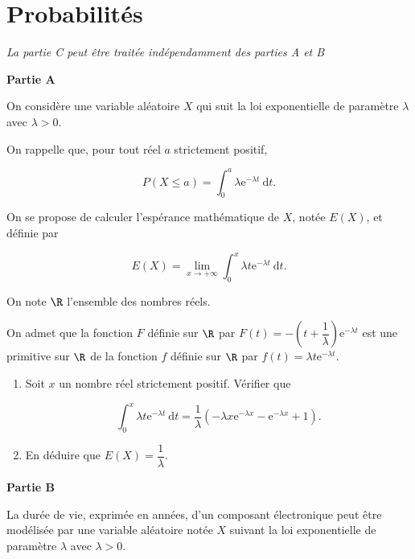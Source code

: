 \documentclass{cornouaille}
\begin{document}
\section{Probabilités}
\begin{exercice}



\emph{La partie C peut être traitée indépendamment des parties A et B}

\bigskip

\textbf{Partie A}

\medskip

On considère une variable aléatoire $X$ qui suit la loi exponentielle de paramètre $\lambda$ avec $\lambda > 0$.

On rappelle que, pour tout réel $a$ strictement positif,

\[P(X \leqslant  a) = \displaystyle\int_0^a \lambda\text{e}^{- \lambda t}\:\text{d}t.\]

On se propose de calculer l'espérance mathématique de $X$, notée $E(X)$, et définie par

\[E(X) = \displaystyle\lim_{x \to + \infty} \int_0^x \lambda t \text{e}^{- \lambda t}\:\text{d}t.\]

On note $\R$ l'ensemble des nombres réels.

On admet que la fonction $F$ définie sur $\R$ par $F(t) = - \left(t + \dfrac{1}{\lambda}\right)\text{e}^{- \lambda t}$ est une primitive sur $\R$ de la fonction $f$ définie sur $\R$ par $f(t) = \lambda t \text{e}^{- \lambda t}$.

\medskip

\begin{enumerate}
\item Soit $x$ un nombre réel strictement positif. Vérifier que

\[\displaystyle \int_0^x \lambda t \text{e}^{- \lambda t}\:\text{d}t = \dfrac{1}{\lambda}\left(- \lambda x \text{e}^{- \lambda x} -  \text{e}^{- \lambda x} + 1\right).\]

\item  En déduire que $E(X) = \dfrac{1}{\lambda}$.
\end{enumerate}

\bigskip

\textbf{Partie B}

\medskip

La durée de vie, exprimée en années, d'un composant électronique peut être modélisée par une
variable aléatoire notée $X$ suivant la loi exponentielle de paramètre $\lambda$ avec $\lambda > 0$.


\end{exercice}
\end{document}
